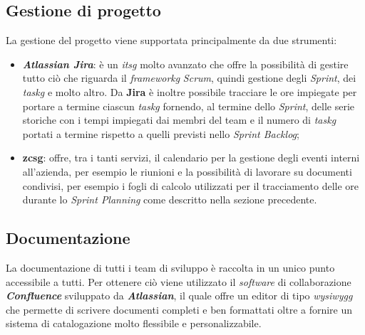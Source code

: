 \newpage

\subsection{Gestione di progetto}
    La gestione del progetto viene supportata principalmente da due strumenti:
    \begin{itemize}
        \item \textit{\textbf{Atlassian Jira}}: è un \textit{\gls{itsg}} molto avanzato che offre la possibilità di gestire tutto ciò che riguarda il \textit{\gls{frameworkg}} \textit{Scrum}, quindi gestione degli \textit{Sprint}, dei \textit{\gls{taskg}} e molto altro. Da \textbf{Jira} è inoltre possibile tracciare le ore impiegate per portare a termine ciascun \textit{\gls{taskg}} fornendo, al termine dello \textit{Sprint}, delle serie storiche con i tempi impiegati dai membri del team e il numero di \textit{\gls{taskg}} portati a termine rispetto a quelli previsti nello \textit{Sprint Backlog}; 
        \item \textbf{\gls{zcsg}}: offre, tra i tanti servizi, il calendario per la gestione degli eventi interni all'azienda, per esempio le riunioni e la possibilità di lavorare su documenti condivisi, per esempio i fogli di calcolo utilizzati per il tracciamento delle ore durante lo \textit{Sprint Planning} come descritto nella sezione precedente. 
    \end{itemize}

\subsection{Documentazione}\label{sec:doc}
    La documentazione di tutti i team di sviluppo è raccolta in un unico punto accessibile a tutti. Per ottenere ciò viene utilizzato il \textit{software} di collaborazione \textit{\textbf{Confluence}} sviluppato da \textit{\textbf{Atlassian}}, il quale offre un editor di tipo \textit{\gls{wysiwygg}} che permette di scrivere documenti completi e ben formattati oltre a fornire un sistema di catalogazione molto flessibile e personalizzabile.

\newpage

